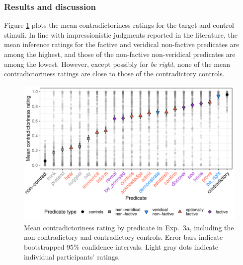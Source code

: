 \documentclass[11pt,fleqn]{article}
\newcommand{\6}{\mbox{$[\hspace*{-.6mm}[$}}
\newcommand{\9}{\mbox{$]\hspace*{-.6mm}]$}}
\begin{document}
{\subsubsection{Results and discussion}


Figure \ref{f-veridicality-predicate2} plots the mean contradictoriness ratings for the target and control stimuli. In line with impressionistic judgments reported in the literature, the mean inference ratings for the factive and veridical non-factive predicates are among the highest, and those of the non-factive non-veridical predicates are among the lowest. However, except possibly for {\em be right}, none of the mean contradictoriness ratings are close to those of the contradictory controls.


\begin{figure}[h!]
\centering

\includegraphics[width=.7\paperwidth]{../../results/2-veridicality2/graphs/means-contradictoriness-by-predicate-variability}

\caption{Mean contradictoriness rating by predicate in Exp.~3a, including the non-contradictory and contradictory controls. Error bars indicate bootstrapped 95\% confidence intervals. Light gray dots indicate individual participants' ratings.}
\label{f-veridicality-predicate2}
\end{figure}

}
\end{document}
